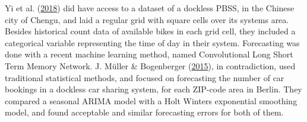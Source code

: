 \documentclass[12pt,oneside]{reedthesis}
\begin{document}
Yi et al. (\protect\hyperlink{ref-yi2018}{2018}) did have access to a
dataset of a dockless PBSS, in the Chinese city of Chengu, and laid a
regular grid with square cells over its systems area. Besides historical
count data of available bikes in each grid cell, they included a
categorical variable representing the time of day in their system.
Forecasting was done with a recent machine learning method, named
Convolutional Long Short Term Memory Network. J. Müller \& Bogenberger
(\protect\hyperlink{ref-muller2015}{2015}), in contradiction, used
traditional statistical methods, and focused on forecasting the number
of car bookings in a dockless car sharing system, for each ZIP-code area
in Berlin. They compared a seasonal ARIMA model with a Holt Winters
exponential smoothing model, and found acceptable and similar
forecasting errors for both of them.
\end{document}
